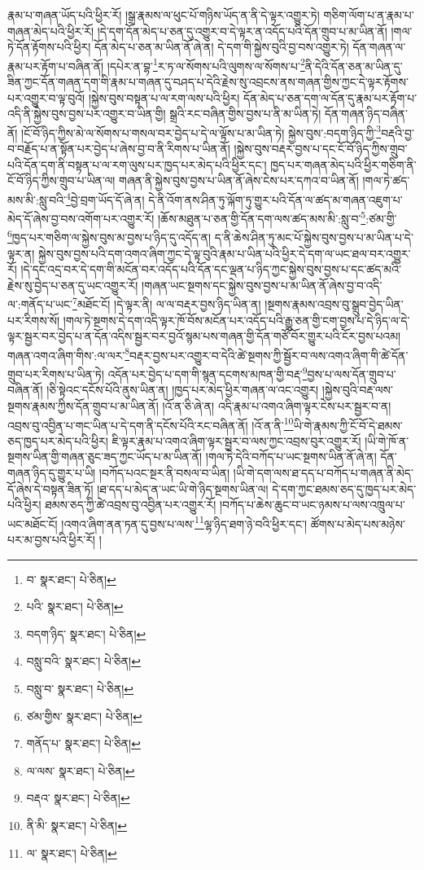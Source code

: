 རྣམ་པ་གཞན་ཡོད་པའི་ཕྱིར་རོ། །སྒྲ་རྣམས་ལ་ཕུང་པོ་གཉིས་ཡོད་ན་ནི་དེ་ལྟར་འགྱུར་ཏེ། གཅིག་ལོག་པ་ན་རྣམ་པ་གཞན་མེད་པའི་ཕྱིར་རོ། །དེ་དག་དོན་མེད་པ་ཅན་དུ་འགྱུར་བ་དེ་ལྟར་ན་འདོད་པའི་དོན་གྲུབ་པ་མ་ཡིན་ནོ། །གལ་ཏེ་དོན་རྟོགས་པའི་ཕྱིར། དོན་མེད་པ་ཅན་མ་ཡིན་ནོ་ཞེ་ན། དེ་དག་གི་སྐྱེས་བུའི་བྱ་བས་འགྱུར་ཏེ། དོན་གཞན་ལ་རྣམ་པར་རྟོག་པ་བཞིན་ནོ། །དཔེར་ན་བྷ་\footnote{བ་  སྣར་ཐང་།  པེ་ཅིན། }ར་ཏ་ལ་སོགས་པའི་ལུགས་ལ་སོགས་པ་\footnote{པའི་  སྣར་ཐང་།  པེ་ཅིན། }ནི་དེའི་དོན་ཅན་མ་ཡིན་དུ་ཟིན་ཀྱང་དོན་གཞན་དག་གི་རྣམ་པ་གཞན་དུ་བཤད་པ་དེའི་རྗེས་སུ་འབྲངས་ནས་གཞན་གྱིས་ཀྱང་དེ་ལྟར་རྟོགས་པར་འགྱུར་བ་ལྟ་བུའོ། །སྐྱེས་བུས་བསྟན་པ་ལ་རག་ལས་པའི་ཕྱིར། དོན་མེད་པ་ཅན་དག་ལ་དོན་དུ་རྣམ་པར་རྟོག་པ་འདི་ནི་སྐྱེས་བུས་བྱས་པར་འགྱུར་བ་ཡིན་གྱི། སྒྲའི་རང་བཞིན་གྱིས་བྱས་པ་ནི་མ་ཡིན་ཏེ། དོན་གཞན་ཉིད་བཞིན་ནོ། །ངོ་བོ་ཉིད་ཀྱིས་མེ་ལ་སོགས་པ་གསལ་བར་བྱེད་པ་དེ་ལ་ལྟོས་པ་མ་ཡིན་ཏེ། སྐྱེས་བུས་:བདག་ཉིད་ཀྱི་\footnote{བདག་ཉིད་  སྣར་ཐང་།  པེ་ཅིན། }བརྡའི་བྱ་བ་བརྗོད་པ་ན་སྟོན་པར་བྱེད་པ་ཞེས་བྱ་བ་ནི་རིགས་པ་ཡིན་ནོ། །སྐྱེས་བུས་བརྡར་བྱས་པ་དང་ངོ་བོ་ཉིད་ཀྱིས་གྲུབ་པའི་དོན་དག་ནི་བསྟན་པ་ལ་རག་ལུས་པར་ཁྱད་པར་མེད་པའི་ཕྱིར་དང་། ཁྱད་པར་གཞན་མེད་པའི་ཕྱིར་གཅིག་ནི་ངོ་བོ་ཉིད་ཀྱིས་གྲུབ་པ་ཡིན་ལ། གཞན་ནི་སྐྱེས་བུས་བྱས་པ་ཡིན་ནོ་ཞེས་ངེས་པར་དཀའ་བ་ཡིན་ནོ། །གལ་ཏེ་ཚད་མས་མི་:སླུ་བའི་\footnote{བསླུ་བའི་  སྣར་ཐང་།  པེ་ཅིན། }བྱེ་བྲག་ཡོད་དོ་ཞེ་ན། དེ་ནི་འོག་ནས་ཤིན་ཏུ་ལྐོག་ཏུ་གྱུར་པའི་དོན་ལ་ཚད་མ་གཞན་འཇུག་པ་མེད་དོ་ཞེས་བྱ་བས་འགོག་པར་འགྱུར་རོ། །ཆོས་མཐུན་པ་ཅན་གྱི་དོན་དག་ལས་ཚད་མས་མི་:སླུ་བ་\footnote{བསླུ་བ་  སྣར་ཐང་།  པེ་ཅིན། }:ཙམ་གྱི་\footnote{ཙམ་གྱིས་  སྣར་ཐང་།  པེ་ཅིན། }ཁྱད་པར་གཅིག་ལ་སྐྱེས་བུས་མ་བྱས་པ་ཉིད་དུ་འདོད་ན། ད་ནི་ཆེས་ཤིན་ཏུ་མང་པོ་སྐྱེས་བུས་བྱས་པ་མ་ཡིན་པ་དེ་ལྟར་ན། སྐྱེས་བུས་བྱས་པའི་དག་འགའ་ཞིག་ཀྱང་དེ་ལྟ་བུའི་རྣམ་པ་ཡིན་པའི་ཕྱིར་དེ་དག་ལ་ཡང་ཐལ་བར་འགྱུར་རོ། །དེ་དང་འདྲ་བར་དེ་དག་གི་མངོན་བར་འདོད་པའི་དོན་དང་ལྡན་པ་ཉིད་ཀྱང་སྐྱེས་བུས་བྱས་པ་དང་ཚད་མའི་རྗེས་སུ་བྱེད་པ་ཅན་དུ་ཡང་འགྱུར་རོ། །གཞན་ཡང་སྔགས་དང་སྐྱེས་བུས་བྱས་པ་མ་ཡིན་ནོ་ཞེས་བྱ་བ་འདི་ལ་:གནོད་པ་ཡང་\footnote{གནོད་པ་  སྣར་ཐང་།  པེ་ཅིན། }མཐོང་ངོ། །དེ་ལྟར་ནི། ལ་ལ་བརྡར་བྱས་ཉིད་ཡིན་ན། །སྔགས་རྣམས་འབྲས་བུ་སྒྲུབ་བྱེད་ཡིན་པར་རིགས་སོ། །གལ་ཏེ་སྔགས་དེ་དག་འདི་ལྟར་ཁོ་བོས་མངོན་པར་འདོད་པའི་རྒྱུ་ཅན་གྱི་ངག་བྱས་པ་དེ་ཉིད་ལ་དེ་ལྟར་སྦྱར་བར་བྱེད་པ་ན་དོན་འདིས་སྦྱར་བར་བྱའོ་སྙམ་པས་གཞན་གྱི་དོན་གཙོ་བོར་གྱུར་པའི་ངོར་བྱས་པའམ། གཞན་འགའ་ཞིག་གིས་:ལ་ལར་\footnote{ལ་ལས་  སྣར་ཐང་།  པེ་ཅིན། }བརྡར་བྱས་པར་འགྱུར་བ་དེའི་ཚེ་སྔགས་ཀྱི་སྦྱོར་བ་ལས་འགའ་ཞིག་གི་ཚེ་དོན་གྲུབ་པར་རིགས་པ་ཡིན་ཏེ། འདོན་པར་བྱེད་པ་དག་གི་སྙན་དངགས་མཁན་གྱི་བརྡ་\footnote{བརྡའ་  སྣར་ཐང་།  པེ་ཅིན། }བྱས་པ་ལས་དོན་གྲུབ་པ་བཞིན་ནོ། །ཅི་སྟེའང་དངོས་པོའི་ནུས་ཡིན་ན། །ཁྱད་པར་མེད་ཕྱིར་གཞན་ལ་འང་འགྱུར། །སྐྱེས་བུའི་བརྡ་ལས་སྔགས་རྣམས་ཀྱིས་དོན་གྲུབ་པ་མ་ཡིན་ནོ། །འོ་ན་ཅི་ཞེ་ན། འདི་རྣམ་པ་འགའ་ཞིག་ལྟར་ངེས་པར་སྦྱར་བ་ན། འབྲས་བུ་འབྱིན་པ་གང་ཡིན་པ་དེ་དག་ནི་དངོས་པོའི་རང་བཞིན་ནོ། །འོ་ན་ནི་\footnote{ནི་མི་  སྣར་ཐང་།  པེ་ཅིན། }ཡི་གེ་རྣམས་ཀྱི་ངོ་བོ་དེ་ཐམས་ཅད་ཁྱད་པར་མེད་པའི་ཕྱིར། ཇི་ལྟར་རྣམ་པ་འགའ་ཞིག་ལྟར་སྦྱར་བ་ལས་ཀྱང་འབྲས་བུར་འགྱུར་རོ། །ཡི་གེ་ཁོ་ན་སྔགས་ཡིན་གྱི་གཞན་ཅུང་ཟད་ཀྱང་ཡོད་པ་མ་ཡིན་ནོ། །གལ་ཏེ་དེའི་བཀོད་པ་ཡང་སྔགས་ཡིན་ནོ་ཞེ་ན། དོན་གཞན་ཉིད་དུ་གྱུར་པ་ཡི། །བཀོད་པའང་སྔར་ནི་བསལ་བ་ཡིན། །ཡི་གེ་དག་ལས་ཐ་དད་པ་བཀོད་པ་གཞན་ནི་མེད་དོ་ཞེས་དེ་བསྟན་ཟིན་ཏོ། །ཐ་དད་པ་མེད་ན་ཡང་ཡི་གེ་ཉིད་སྔགས་ཡིན་ལ། དེ་དག་ཀྱང་ཐམས་ཅད་དུ་ཁྱད་པར་མེད་པའི་ཕྱིར། ཐམས་ཅད་ཀྱི་ཚེ་འབྲས་བུ་འབྱིན་པར་འགྱུར་རོ། །བཀོད་པ་ཆེས་ཆུང་བ་ཡང་ཉམས་པ་ལས་འཁྲུལ་པ་ཡང་མཐོང་ངོ། །འགའ་ཞིག་ནན་ཏན་དུ་བྱས་པ་ལས་\footnote{ལ་  སྣར་ཐང་།  པེ་ཅིན། }ལྷ་ཉིད་ཐག་ཉེ་བའི་ཕྱིར་དང་། ཚོགས་པ་མེད་པས་མཉེས་པར་མ་བྱས་པའི་ཕྱིར་རོ། །
